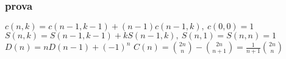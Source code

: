\subsubsection{prova}
\begin{center}
$c(n,k) = c(n-1,k-1) + (n-1) c(n-1,k),\ c(0,0) = 1 $
$S(n,k) = S(n-1,k-1) + k S(n-1,k),\ S(n,1) = S(n,n) = 1 $
$D(n)=nD(n-1)+(-1)^n$
$C(n)=\binom{2n}{n}-\binom{2n}{n+1}=\frac{1}{n+1}\binom{2n}{n}$
\end{center}
